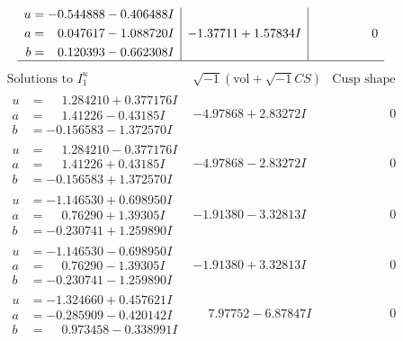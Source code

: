 \documentclass[1p]{elsarticle_modified}
\theoremstyle{definition}
\newcommand{\I}{\sqrt{-1}}
\begin{document}
$$\begin{array}{c|c|c}
\begin{aligned}
u &= -0.544888 - 0.406488 I \\
a &= \phantom{-}0.047617 - 1.088720 I \\
b &= \phantom{-}0.120393 - 0.662308 I\end{aligned}
 & -1.37711 + 1.57834 I & \phantom{-0.000000 } 0\\
 \hline 
 \end{array}$$\newpage$$\begin{array}{c|c|c}  
\text{Solutions to }I^u_{1}& \I (\text{vol} + \sqrt{-1}CS) & \text{Cusp shape}\\
 \hline 
\begin{aligned}
u &= \phantom{-}1.284210 + 0.377176 I \\
a &= \phantom{-}1.41226 - 0.43185 I \\
b &= -0.156583 - 1.372570 I\end{aligned}
 & -4.97868 + 2.83272 I & \phantom{-0.000000 } 0 \\ \hline\begin{aligned}
u &= \phantom{-}1.284210 - 0.377176 I \\
a &= \phantom{-}1.41226 + 0.43185 I \\
b &= -0.156583 + 1.372570 I\end{aligned}
 & -4.97868 - 2.83272 I & \phantom{-0.000000 } 0 \\ \hline\begin{aligned}
u &= -1.146530 + 0.698950 I \\
a &= \phantom{-}0.76290 + 1.39305 I \\
b &= -0.230741 + 1.259890 I\end{aligned}
 & -1.91380 - 3.32813 I & \phantom{-0.000000 } 0 \\ \hline\begin{aligned}
u &= -1.146530 - 0.698950 I \\
a &= \phantom{-}0.76290 - 1.39305 I \\
b &= -0.230741 - 1.259890 I\end{aligned}
 & -1.91380 + 3.32813 I & \phantom{-0.000000 } 0 \\ \hline\begin{aligned}
u &= -1.324660 + 0.457621 I \\
a &= -0.285909 - 0.420142 I \\
b &= \phantom{-}0.973458 - 0.338991 I\end{aligned}
 & \phantom{-}7.97752 - 6.87847 I & \phantom{-0.000000 } 0 \\ \hline\begin{aligned}

\end{aligned}
\end{array}$$
\end{document}
